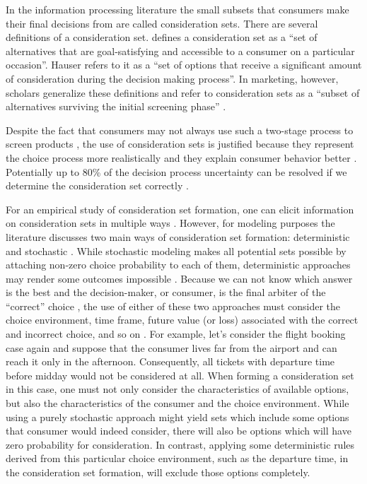 \documentclass[a4paper,12pt]{article}
\newcommand{\citeyearonly}[1]{\citeyearpar{#1}}
\begin{document}
In the information processing literature the small subsets that consumers make their final decisions from are called consideration sets. There are several definitions of a consideration set. \citep{shocker1991consideration} defines a consideration set as a ``set of alternatives that are goal-satisfying and accessible to a consumer on a particular occasion''. Hauser \citeyearonly{hauser1990evaluation} refers to it as a ``set of options that receive a significant amount of consideration during the decision making process''. In marketing, however, scholars generalize these definitions and  refer to consideration sets as a ``subset of alternatives surviving the initial screening phase'' \citep{haubl2000consumer}. 

Despite the fact that consumers may not always use such a two-stage process to screen products \citep{hauser2009non}, the use of consideration sets is justified because they represent the choice process more realistically and they explain consumer behavior better \citep{horowitz1995role}. Potentially up to 80\% of the decision process uncertainty can be resolved if we determine the consideration set correctly \citep{hauser1978testing}. 

For an empirical study of consideration set formation, one can elicit information on consideration sets in multiple ways \citep{gaskin2007two,yee2007greedoid, ding2011unstructured}. However, for modeling purposes the literature discusses two main ways of consideration set formation: deterministic \citep{coombs1951mathematical} and stochastic \citep{mcfadden1973conditional, urban1984testing}. While stochastic modeling makes all potential sets possible by attaching non-zero choice probability to each of them, deterministic approaches may render some outcomes impossible \citep{aribarg2018advancing}. Because we can not know which answer is the best and the decision-maker, or consumer, is the final arbiter of the ``correct'' choice \citep{hauser2014consideration}, the use of either of these two approaches must consider the choice environment, time frame, future value (or loss) associated with the correct and incorrect choice, and so on \citep{punj2009information}. For example, let's consider the flight booking case again and suppose that the consumer lives far from the airport and can reach it only in the afternoon. Consequently, all tickets with departure time before midday would not be considered at all. When forming a consideration set in this case, one must not only consider the characteristics of available options, but also the characteristics of the consumer and the choice environment. While using a purely stochastic approach might yield sets which include some options that consumer would indeed consider, there will also be options which will have zero probability for consideration. In contrast, applying some deterministic rules derived from this particular choice environment, such as the departure time, in the consideration set formation, will exclude those options completely.
\end{document}
